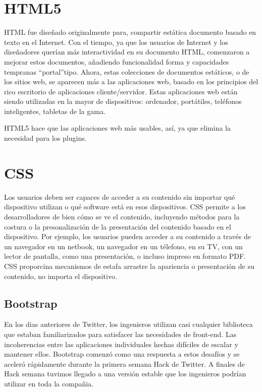 \section{HTML5}

HTML fue dise\~{n}ado originalmente para, compartir est\'{a}tica documento basado
en texto en el Internet. Con el tiempo, ya que los usuarios de Internet y los 
dise\~{n}adores quer\'{i}an m\'{a}s interactividad en su documento HTML, comenzaron
a mejorar estos documentos, a\~{n}adiendo funcionalidad forma y capacidades tempranas
\textquotedblleft portal\textquotedblright tipo. Ahora, estas colecciones de 
documentos est\'{a}ticos, o de los sitios web, se aparecen m\'{a}s a las aplicaciones
web, basado en los principios del rico escritorio de aplicaciones cliente/servidor.
Estas aplicaciones web est\'{a}n siendo utilizadas en la mayor de dispositivos: 
ordenador, port\'{a}tiles, tel\'{e}fonos inteligentes, tabletas de la gama.

HTML5 hace que las aplicaciones web m\'{a}s usables, as\'{i}, ya que elimina la
necesidad para los plugins. \cite{wang2013definitive}


\section{CSS}

Los usuarios deben ser capaces de acceder a su contenido sin importar qu\'{e} 
dispositivo utilizan o qu\'{e} software est\'{a} en esos dispositivos. CSS 
permite a los desarrolladores de bien c\'{o}mo se ve el contenido, incluyendo 
m\'{e}todos para la costura o la presonalizaci\'{o}n de la presentaci\'{o}n del
contenido basado en el dispositivo. Por ejemplo, los usuarios pueden acceder a su
contenido a trav\'{e}s de un navegador en un netbook, un navegador en un t\'{e}lefono,
en su TV, con un lector de pantalla, como una presentaci\'{o}n, o incluso impreso
en formato PDF. CSS proporcina mecanismos de estafa arrastre la apariencia o 
presentaci\'{o}n de su contenido, no importa el dispositivo.\cite{weyl2012s}

\subsection{Bootstrap}

En los dias anteriores de Twitter, los ingenieros utilizan casi cualquier 
biblioteca que estaban familiarizados para satisfacer las necesidades de 
front-end. Las incoherencias entre las aplicaciones individuales hechas dif\'{i}ciles
de escalar y mantener ellos. Bootstrap comenz\'{o} como una respuesta a estos 
desaf\'{i}os y se aceler\'{o} r\'{a}pidamente durante la primera semana Hack de
Twitter. A finales de Hack semana tuvimos llegado a una versi\'{o}n estable que
los ingenieros podr\'{i}an utilizar en toda la compa\~{n}ia.\cite{spurlock2013bootstrap}

